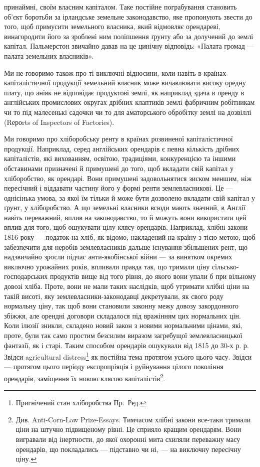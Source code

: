 \parcont{}  %
принаймні, своїм власним капіталом. Таке постійне пограбування становить об’єкт
боротьби за ірландське земельне законодавство, яке пропонують звести до того,
щоб примусити земельного власника, який відмовляє орендареві, винагородити
його за зроблені ним поліпшення ґрунту або за долучений до землі капітал.
Пальмерстон звичайно давав на це цинічну відповідь: «Палата громад — палата
земельних власників».

Ми не говоримо також про ті виключні відносини, коли навіть в країнах
капіталістичної продукції земельний власник може вичавлювати високу оредну
плату, що аніяк не відповідає продуктові землі, як наприклад здача в оренду
в англійських промислових округах дрібних клаптиків землі фабричним робітникам
чи то під малесенькі садочки чи то для аматорського обробітку землі на
дозвіллі (Rероrts of Inspectors of Factories).

Ми говоримо про хліборобську ренту в країнах розвиненої капіталістичної
продукції. Наприклад, серед англійських орендарів є певна кількість дрібних
капіталістів, які вихованням, освітою, традиціями, конкуренцією та іншими обставинами
призначені й примушені до того, щоб вкладати свій капітал у
хліборобство, як орендарі. Вони примушені задовольнятися зиском меншим,
ніж пересічний і віддавати частину його у формі ренти землевласникові. Це —
однісінька умова, за якої їм тільки й може бути дозволено вкладати свій
капітал у ґрунт, у хліборобство. А що земельні власники всюди мають значний,
в Англії навіть переважний, вплив на законодавство, то й можуть вони використати
цей вплив для того, щоб ошукувати цілу клясу орендарів. Наприклад,
хлібні закони 1816 року — податок на хліб, як відомо, накладений на
країну з тією метою, щоб забезпечити для неробів землевласників дальше існування
збільшених рент, що надзвичайно зросли підчас анти-якобінської війни —
за винятком окремих виключно урожайних років, впливали правда так, що тримали
ціну сільсько-господарських продуктів вище від того рівня, до якого вони
упали б при вільному довозі хліба. Проте, вони не мали таких наслідків, щоб
утримати хлібні ціни на такій висоті, яку землевласники-законодавці декретували,
як свого роду нормальну ціну, так щоб вони становили законну межу довозу
закордонного збіжжя, але орендні договори складалося під вражінням цих
нормальних цін. Коли ілюзії зникли, складено новий закон з новими нормальними
цінами, які, проте, були так само простим безсилим виразом загребущої
землевласницької фантазії, як і старі. Таким способом орендарів ошукували
від 1815 до 30-х р. р. Звідси agricultural distress\footnote*{
Пригнічений стан хліборобства Пр.~Ред.
} як постійна тема протягом
усього цього часу. Звідси — протягом цього періоду експропріяція і руйнування
цілого покоління орендарів, заміщення їх новою клясою капіталістів\footnote{
Див. Anti-Corn-Law Prize-Essays. Тимчасом хлібні закони все-таки тримали ціни на штучно
підвищеному рівні. Це сприяло кращим орендарям. Вони вигравали від інертности, до якої охоронні
мита схиляли переважну масу орендарів, що покладались — підставно чи ні, — на виключну
пересічну ціну.
}.

